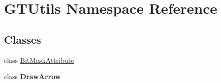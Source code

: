 \hypertarget{namespace_g_t_utils}{}\section{G\+T\+Utils Namespace Reference}
\label{namespace_g_t_utils}
\subsection*{Classes}
\begin{DoxyCompactItemize}
\item 
class \hyperlink{class_g_t_utils_1_1_bit_mask_attribute}{Bit\+Mask\+Attribute}
\item 
class {\bfseries Draw\+Arrow}
\end{DoxyCompactItemize}
